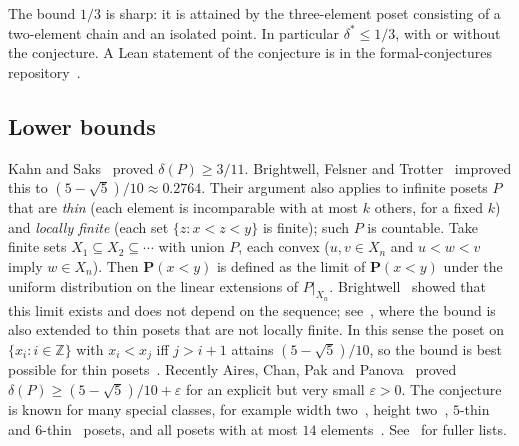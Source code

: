 \documentclass[11pt]{amsart}
\theoremstyle{definition}
\theoremstyle{remark}
\newcommand{\Prob}{\mathbf{P}}
\begin{document}
The bound $1/3$ is sharp: it is attained by the three-element poset consisting of a two-element chain and an isolated point. In particular $\delta^*\le 1/3$, with or without the conjecture. A Lean statement of the conjecture is in the formal-conjectures repository~\cite{FC}.

\subsection*{Lower bounds}
Kahn and Saks~\cite{KS84} proved $\delta(P)\ge 3/11$. Brightwell, Felsner and Trotter~\cite{BFT95} improved this to $(5-\sqrt5)/10\approx0.2764$. Their argument also applies to infinite posets $P$ that are \emph{thin} (each element is incomparable with at most $k$ others, for a fixed $k$) and \emph{locally finite} (each set $\{z:x<z<y\}$ is finite); such $P$ is countable. Take finite sets $X_1\subseteq X_2\subseteq\cdots$ with union $P$, each convex ($u,v\in X_n$ and $u<w<v$ imply $w\in X_n$). Then $\Prob(x<y)$ is defined as the limit of $\Prob(x<y)$ under the uniform distribution on the linear extensions of $P|_{X_n}$. Brightwell~\cite{Bri88} showed that this limit exists and does not depend on the sequence; see~\cite[Section~7]{BFT95}, where the bound is also extended to thin posets that are not locally finite. In this sense the poset on $\{x_i:i\in\mathbb{Z}\}$ with $x_i<x_j$ iff $j>i+1$ attains $(5-\sqrt5)/10$, so the bound is best possible for thin posets~\cite[Theorem~1.4]{BFT95}. Recently Aires, Chan, Pak and Panova~\cite{ACPP26} proved $\delta(P)\ge(5-\sqrt5)/10+\varepsilon$ for an explicit but very small $\varepsilon>0$. The conjecture is known for many special classes, for example width two~\cite{Lin84}, height two~\cite{TGF92}, $5$-thin~\cite{BW92} and $6$-thin~\cite{Pec08} posets, and all posets with at most $14$ elements~\cite{Gup26}. See~\cite{Bri99,ACPP26} for fuller lists.
\end{document}
